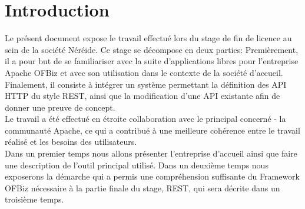 \chapter{Introduction}

Le présent document expose le travail effectué lors du stage de fin de licence au sein de la société Néréide.
Ce stage se décompose en deux parties: 
Premièrement, il a pour but de se familiariser avec la suite d'applications libres
pour l'entreprise
Apache OFBiz et avec son utilisation dans le contexte de la société d'accueil. 
Finalement, il consiste à intégrer un système permettant la définition des API HTTP
du style REST,
 ainsi que la modification d'une API existante afin de donner une preuve de concept. \\
Le travail a été effectué en étroite collaboration avec le principal concerné - la 
communauté Apache,
ce qui a contribué à une meilleure cohérence entre le travail réalisé et les besoins des utilisateurs.\\
Dans un premier temps nous allons présenter l'entreprise d'accueil ainsi que faire une description de
l'outil principal utilisé.
Dans un deuxième temps nous exposerons la démarche qui a permis une compréhension suffisante du Framework OFBiz
 nécessaire à la partie finale du stage, REST, qui sera décrite dans un troisième temps. 

